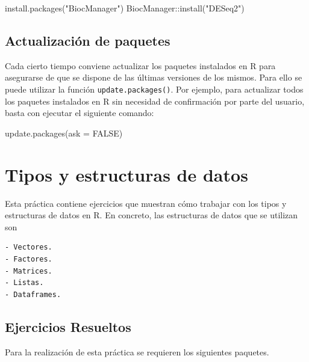 \documentclass[
  a4paper,
]{scrreport}
\newenvironment{Shaded}{\begin{snugshade}}{\end{snugshade}}
\newcommand{\AttributeTok}[1]{\textcolor[rgb]{0.40,0.45,0.13}{#1}}
\newcommand{\ConstantTok}[1]{\textcolor[rgb]{0.56,0.35,0.01}{#1}}
\newcommand{\FunctionTok}[1]{\textcolor[rgb]{0.28,0.35,0.67}{#1}}
\newcommand{\NormalTok}[1]{\textcolor[rgb]{0.00,0.23,0.31}{#1}}
\newcommand{\SpecialCharTok}[1]{\textcolor[rgb]{0.37,0.37,0.37}{#1}}
\newcommand{\StringTok}[1]{\textcolor[rgb]{0.13,0.47,0.30}{#1}}
\theoremstyle{definition}
\theoremstyle{remark}
\begin{document}
\begin{Shaded}
\begin{Highlighting}[]
\FunctionTok{install.packages}\NormalTok{(}\StringTok{"BiocManager"}\NormalTok{)}
\NormalTok{BiocManager}\SpecialCharTok{::}\FunctionTok{install}\NormalTok{(}\StringTok{"DESeq2"}\NormalTok{)}
\end{Highlighting}
\end{Shaded}

\section{Actualización de paquetes}\label{actualizaciuxf3n-de-paquetes}

Cada cierto tiempo conviene actualizar los paquetes instalados en R para
asegurarse de que se dispone de las últimas versiones de los mismos.
Para ello se puede utilizar la función \texttt{update.packages()}. Por
ejemplo, para actualizar todos los paquetes instalados en R sin
necesidad de confirmación por parte del usuario, basta con ejecutar el
siguiente comando:

\begin{Shaded}
\begin{Highlighting}[]
\FunctionTok{update.packages}\NormalTok{(}\AttributeTok{ask =} \ConstantTok{FALSE}\NormalTok{)}
\end{Highlighting}
\end{Shaded}


\chapter{Tipos y estructuras de
datos}\label{tipos-y-estructuras-de-datos}

Esta práctica contiene ejercicios que muestran cómo trabajar con los
tipos y estructuras de datos en R. En concreto, las estructuras de datos
que se utilizan son

\begin{verbatim}
- Vectores.
- Factores.
- Matrices.
- Listas.
- Dataframes.
\end{verbatim}

\section{Ejercicios Resueltos}\label{ejercicios-resueltos}

Para la realización de esta práctica se requieren los siguientes
paquetes.
\end{document}
